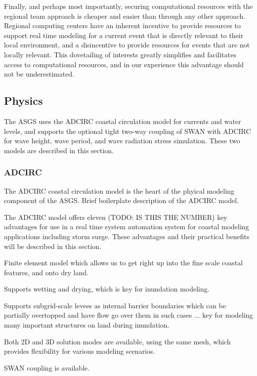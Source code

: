 \documentclass[12pt]{article}
\begin{document}
Finally, and perhaps most importantly, securing computational 
resources with the regional team approach is cheaper and easier than 
through any other approach. Regional computing centers have an 
inherent incentive to provide resources to support real time 
modeling for a current event that is directly relevant to their 
local environment, and a disincentive to provide resources for 
events that are not locally relevant. This dovetailing of interests 
greatly simplifies and facilitates access to computational 
resources, and in our experience this advantage should not be 
underestimated. 

\subsection{Physics}

The ASGS uses the ADCIRC coastal circulation model for currents and water
levels, and supports the optional tight two-way coupling of SWAN with ADCIRC 
for wave height, wave period, and wave radiation stress simulation. These
two models are described in this section. 

\subsubsection{ADCIRC}

The ADCIRC coastal circulation model is the heart of the phyical 
modeling component of the ASGS. Brief boilerplate description of the 
ADCIRC model. 

The ADCIRC model offers eleven (TODO: IS THIS THE NUMBER) key 
advantages for use in a real time system automation system for 
coastal modeling applications including storm surge. These 
advantages and their practical benefits will be described in this 
section. 

Finite element model which allows us to get right up into the fine 
scale coastal features, and onto dry land. 

Supports wetting and drying, which is key for inundation modeling.

Supports subgrid-scale levees as internal barrier boundaries which 
can be partially overtopped and have flow go over them in such cases 
... key for modeling many important structures on land during 
inundation. 

Both 2D and 3D solution modes are available, using the same mesh, 
which provides flexibility for various modeling scenarios. 

SWAN coupling is available. 
\end{document}

